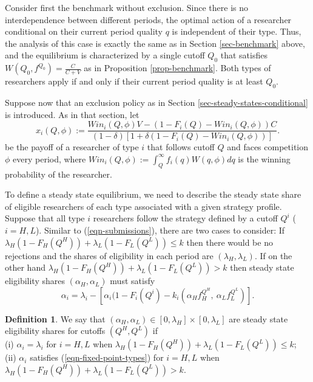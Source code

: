 \documentclass[12pt]{article}
\theoremstyle{plain}
\theoremstyle{definition}
\newtheorem{definition}{Definition}
\theoremstyle{remark}
\begin{document}
Consider first the benchmark without exclusion. Since there is no interdependence between different periods, the optimal action of a researcher conditional on their current period quality $q$ is independent of their type. Thus, the analysis of this case is exactly the same as in Section \ref{sec-benchmark} above, and the equilibrium is characterized by a single cutoff $Q_0$ that satisfies $W(Q_0,f^{Q_0})=\frac{C}{C+V}$ as in Proposition \ref{prop-benchmark}. Both types of researchers apply if and only if their current period quality is at least $Q_0$.

Suppose now that an exclusion policy as in Section \ref{sec-steady-states-conditional} is introduced. As in that section, let 
\begin{equation}\label{eqn-steady-state-payoff-types}
x_i(Q,\phi) :=\frac{Win_i(Q,\phi)V-(1-F_i(Q)-Win_i(Q,\phi))C}{(1-\delta)[1 + \delta(1-F_i(Q)-Win_i(Q,\phi))]}.
\end{equation}
be the payoff of a researcher of type $i$ that follows cutoff $Q$ and faces competition $\phi$ every period, where $Win_i(Q,\phi) := \int_Q^{\infty} f_i(q)W(q,\phi)dq$ is the winning probability of the researcher. 

To define a steady state equilibrium, we need to describe the steady state share of eligible researchers of each type associated with a given strategy profile. Suppose that all type $i$ researchers follow the strategy defined by a cutoff $Q^i$ ($i=H,L$). Similar to (\ref{eqn-submissions}), there are two cases to consider: If $\lambda_H(1-F_H(Q^H))+\lambda_L(1-F_L(Q^L))\le k$ then there would be no rejections and the shares of eligibility in each period are $(\lambda_H,\lambda_L)$. If on the other hand $\lambda_H(1-F_H(Q^H))+\lambda_L(1-F_L(Q^L))> k$ then steady state eligibility shares $(\alpha_H,\alpha_L)$ must satisfy
\begin{equation}\label{eqn-fixed-point-types}
    \alpha_i=\lambda_i - \left[\alpha_i(1-F_i(Q^i)- k_i\left(\alpha_H f_H^{Q^H},~ \alpha_L f_L^{Q^L}\right) \right].
\end{equation}

\begin{definition}\label{def-fixed-point-types}
    We say that $(\alpha_H,\alpha_L)\in [0,\lambda_H] \times [0,\lambda_L]$ are steady state eligibility shares for cutoffs $(Q^H,Q^L)$ if\\
    (i) $\alpha_i=\lambda_i$ for $i=H,L$ when $\lambda_H(1-F_H(Q^H))+\lambda_L(1-F_L(Q^L))\le k$; \\
    (ii) $\alpha_i$ satisfies (\ref{eqn-fixed-point-types}) for $i=H,L$ when $\lambda_H(1-F_H(Q^H))+\lambda_L(1-F_L(Q^L))> k$.
\end{definition}
\end{document}
